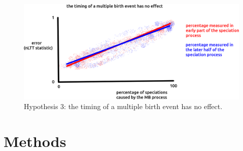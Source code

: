 \documentclass{article}
\begin{document}
\begin{itemize}
\begin{figure}[!htbp]
  \includegraphics[width=\textwidth]{fig_h_3.png}
  \caption{
    Hypothesis 3: the timing of a multiple birth event has no effect.
  }
  \label{fig_h_3}
\end{figure}

\end{itemize}

\section{Methods}
\end{document}
